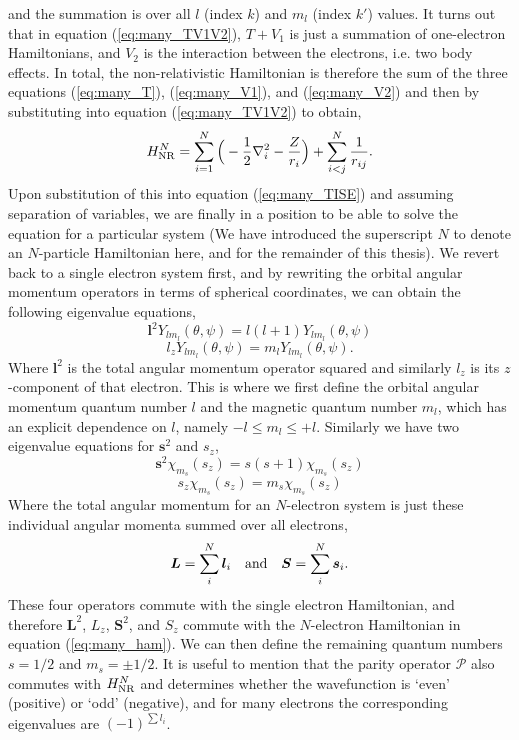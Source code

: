 and the summation is over all $l$ (index $k$) and $m_l$ (index $k'$) values. It turns out that in equation (\ref{eq:many_TV1V2}), $T+V_1$ is just a summation of one-electron Hamiltonians, and $V_2$ is the interaction between the electrons, i.e. two body effects. In total, the non-relativistic Hamiltonian is therefore the sum of the three equations (\ref{eq:many_T}), (\ref{eq:many_V1}), and (\ref{eq:many_V2}) and then by substituting into equation (\ref{eq:many_TV1V2}) to obtain,
	\begin{equation}\label{eq:many_ham}
	H^N_{{\rm NR}}=\sum_{i=1}^N\Big(-\frac{1}{2}\nabla_i^2-\frac{Z}{r_i}\Big)+\sum_{i<j}^N\frac{1}{r_{ij}}.
	\end{equation}
Upon substitution of this into equation (\ref{eq:many_TISE}) and assuming separation of variables, we are finally in a position to be able to solve the equation for a particular system (We have introduced the superscript $N$ to denote an $N$-particle Hamiltonian here, and for the remainder of this thesis). We revert back to a single electron system first, and by rewriting the orbital angular momentum operators in terms of spherical coordinates, we can obtain the following eigenvalue equations,
	\[
	\boldsymbol{l}^2Y_{lm_l}(\theta,\psi)=l(l+1)Y_{lm_l}(\theta,\psi)
	\]
	\[
	l_zY_{lm_l}(\theta,\psi)=m_lY_{lm_l}(\theta,\psi).
	\]
Where $\boldsymbol{l}^2$ is the total angular momentum operator squared and similarly $l_z$ is its $z$-component of that electron. This is where we first define the orbital angular momentum quantum number $l$ and the magnetic quantum number $m_l$, which has an explicit dependence on $l$, namely $-l \le m_l \le +l$. Similarly we have two eigenvalue equations for $\boldsymbol{s}^2$ and $s_z$, 
	\[
	\boldsymbol{s}^2 \chi_{m_s}(s_z)=s(s+1)\chi_{m_s}(s_z)
	\]
	\[
	s_z\chi_{m_s}(s_z)=m_s\chi_{m_s}(s_z)
	\]
Where the total angular momentum for an $N$-electron system is just these individual angular momenta summed over all electrons,
\begin{equation}\label{eq:many_bigLandbigS}
\boldsymbol{L} = \sum_i^N\boldsymbol{l}_i ~~~ {\rm and} ~~~\boldsymbol{S} = \sum_i^N\boldsymbol{s}_i.
\end{equation}
These four operators commute with the single electron Hamiltonian, and therefore $\boldsymbol{L}^2$, $L_z$, $\boldsymbol{S}^2$, and $S_z$ commute with the $N$-electron Hamiltonian in equation (\ref{eq:many_ham}). We can then define the remaining quantum numbers $s = 1/2$ and $m_s = \pm 1/2$. It is useful to mention that the parity operator $\mathcal{P}$ also commutes with $H^N_{{\rm NR}}$ and determines whether the wavefunction is `even' (positive) or `odd' (negative), and for many electrons the corresponding eigenvalues are $(-1)^{\sum l_i}$. 

